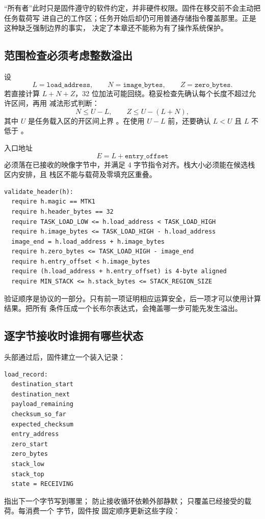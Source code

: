 “所有者”此时只是固件遵守的软件约定，并非硬件权限。固件在移交前不会主动把任务载荷写
进自己的工作区；任务开始后却仍可用普通存储指令覆盖那里。正是这种缺乏强制边界的事实，
决定了本章还不能称为有了操作系统保护。

\subsection{范围检查必须考虑整数溢出}

设
\[
L=\texttt{load\_address},\qquad
N=\texttt{image\_bytes},\qquad
Z=\texttt{zero\_bytes}.
\]
若直接计算 \(L+N+Z\)，32 位加法可能回绕。稳妥检查先确认每个长度不超过允许区间，再用
减法形式判断：
\[
N \le U-L,\qquad
Z \le U-(L+N),
\]
其中 \(U\) 是任务载入区的开区间上界 。在使用 \(U-L\) 前，还要确认
\(L<U\) 且 \(L\) 不低于 。

入口地址
\[
E=L+\texttt{entry\_offset}
\]
必须落在已接收的映像字节中，并满足 4 字节指令对齐。栈大小必须能在候选栈区内安排，且
栈区不能与载荷及零填充区重叠。

\begin{lstlisting}
validate_header(h):
  require h.magic == MTK1
  require h.header_bytes == 32
  require TASK_LOAD_LOW <= h.load_address < TASK_LOAD_HIGH
  require h.image_bytes <= TASK_LOAD_HIGH - h.load_address
  image_end = h.load_address + h.image_bytes
  require h.zero_bytes <= TASK_LOAD_HIGH - image_end
  require h.entry_offset < h.image_bytes
  require (h.load_address + h.entry_offset) is 4-byte aligned
  require MIN_STACK <= h.stack_bytes <= STACK_REGION_SIZE
\end{lstlisting}

验证顺序是协议的一部分。只有前一项证明相应运算安全，后一项才可以使用计算结果。把所有
条件压成一个长布尔表达式，会掩盖哪一步可能先发生溢出。

\subsection{逐字节接收时谁拥有哪些状态}

头部通过后，固件建立一个装入记录：

\begin{lstlisting}
load_record:
  destination_start
  destination_next
  payload_remaining
  checksum_so_far
  expected_checksum
  entry_address
  zero_start
  zero_bytes
  stack_low
  stack_top
  state = RECEIVING
\end{lstlisting}

 指出下一个字节写到哪里；
 防止接收循环依赖外部静默；
 只覆盖已经接受的载荷。每消费一个  字节，固件按
固定顺序更新这些字段：

